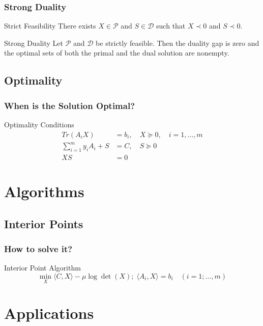 \documentclass[11pt]{beamer}
\begin{document}
\begin{frame}
	\frametitle{Strong Duality}
	\begin{block}{Strict Feasibility}
		There exists $X\in\mathcal{P}$ and $S\in\mathcal{D}$ such that $X\prec 0$ and $S\prec 0$.
	\end{block}
	\begin{block}{Strong Duality}
		Let $\mathcal{P}$ and $\mathcal{D}$ be strictly feasible. Then the duality gap is zero and the optimal sets of both the primal and the dual solution are nonempty.
	\end{block}
\end{frame}
\subsection{Optimality}
	\begin{frame}
		\frametitle{When is the Solution Optimal?}
		\begin{block}{Optimality Conditions}
			\begin{equation*}
			\begin{aligned}
			Tr(A_iX)&=b_i,\quad X\succeq 0,\quad i=1,...,m\\
			\sum_{i=1}^{m}y_iA_i+S&=C,\quad S\succeq 0\\
			XS&=0
			\end{aligned}
			\end{equation*}
		\end{block}
	\end{frame}
\section{Algorithms}
\subsection{Interior Points}
\begin{frame}
	\frametitle{How to solve it?}
	\begin{block}{Interior Point Algorithm}
		\begin{equation*}
			\min_X {\langle C,X \rangle - \mu\log\det(X);\;\langle A_i,X \rangle=b_i\quad(i=1;\dots,m)}
		\end{equation*}
	\end{block}
\end{frame}
\section{Applications}
\end{document}
